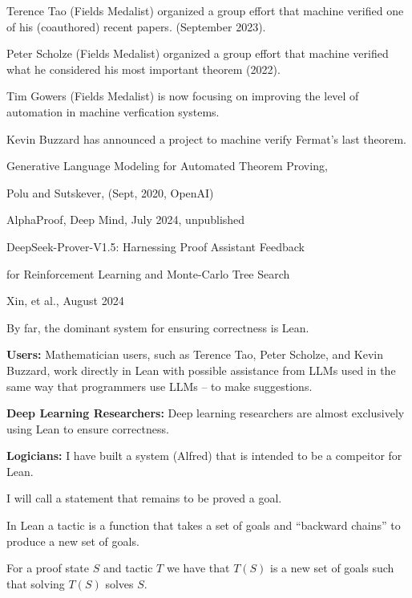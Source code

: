 {

Terence Tao (Fields Medalist) organized a group effort that machine verified one of his (coauthored) recent papers. (September 2023).

\vfill
Peter Scholze (Fields Medalist) organized a group effort that machine verified what he considered his most important theorem (2022).

\vfill
Tim Gowers (Fields Medalist) is now focusing on improving the level of automation in machine verfication systems.

\vfill
Kevin Buzzard has announced a project to machine verify Fermat's last theorem.


\centerline{Generative Language Modeling for Automated Theorem Proving,}
\centerline{Polu and Sutskever, (Sept, 2020, OpenAI)}

\vfill
AlphaProof, Deep Mind, July 2024, unpublished

\vfill
\centerline{DeepSeek-Prover-V1.5: Harnessing Proof Assistant Feedback}
\centerline{for Reinforcement Learning and Monte-Carlo Tree Search}
\centerline{Xin, et al., August 2024}


By far, the dominant system for ensuring correctness is Lean.

\vfill
{\bf Users:} Mathematician users, such as Terence Tao, Peter Scholze, and Kevin Buzzard, work directly in Lean with possible assistance
from LLMs used in the same way that programmers use LLMs -- to make suggestions.

\vfill
{\bf Deep Learning Researchers:} Deep learning researchers are almost exclusively using Lean to ensure correctness.

\vfill
{\bf Logicians:} I have built a system (Alfred) that is intended to be a compeitor for Lean.


I will call a statement that remains to be proved a goal.

\vfill
In Lean a tactic is a function that takes a set of goals and ``backward chains'' to produce a new set of goals.

\vfill
For a proof state $S$ and tactic $T$ we have that $T(S)$ is a new set of goals such that solving $T(S)$ solves $S$.


}
